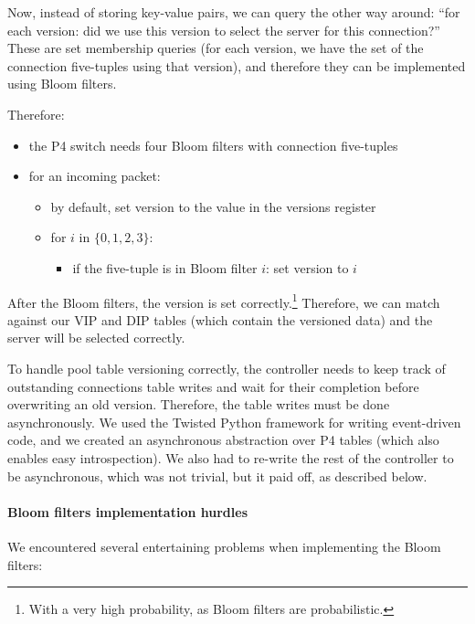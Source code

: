 \documentclass[11pt,oneside,a4paper]{article}
\begin{document}
Now, instead of storing key-value pairs, we can query the other way around:
``for each version: did we use this version to select the server for this
connection?''
These are set membership queries (for each version, we have the set of the
connection five-tuples using that version), and therefore they can be
implemented using Bloom filters.

Therefore:

\begin{itemize}
\item the P4 switch needs four Bloom filters with connection five-tuples
\item for an incoming packet:
    \begin{itemize}
    \item by default, set version to the value in the versions register
    \item for $i$ in $\{0,1,2,3\}$:
        \begin{itemize}
        \item if the five-tuple is in Bloom filter $i$: set version to $i$
        \end{itemize}
    \end{itemize}
\end{itemize}

After the Bloom filters, the version is set correctly.\footnote{%
With a very high probability, as Bloom filters are probabilistic.}
Therefore, we can match against our VIP and DIP tables (which contain the
versioned data) and the server will be selected correctly.

To handle pool table versioning correctly, the controller needs to keep track of
outstanding connections table writes and wait for their completion before
overwriting an old version.
Therefore, the table writes must be done asynchronously.
We used the Twisted Python framework\cite{twisted} for writing event-driven
code, and we created an asynchronous abstraction over P4 tables (which also
enables easy introspection).
We also had to re-write the rest of the controller to be asynchronous, which was
not trivial, but it paid off, as described below.

\paragraph{Bloom filters implementation hurdles}

We encountered several entertaining problems when implementing the Bloom filters:
\end{document}

